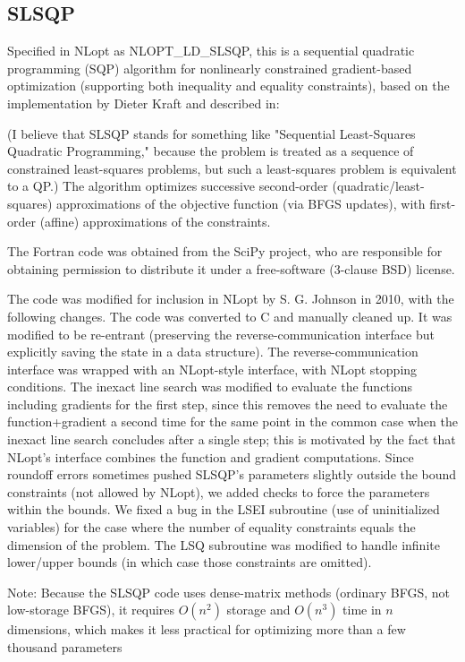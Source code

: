 \subsection{SLSQP}
Specified in NLopt as NLOPT\_LD\_SLSQP, this is a sequential quadratic programming (SQP) algorithm for nonlinearly constrained gradient-based optimization (supporting both inequality and equality constraints), based on the implementation by Dieter Kraft and described in: 

\cite{Kraft_1988, Kraft_1994}

(I believe that SLSQP stands for something like "Sequential Least-Squares Quadratic Programming," because the problem is treated as a sequence of constrained least-squares problems, but such a least-squares problem is equivalent to a QP.) The algorithm optimizes successive second-order (quadratic/least-squares) approximations of the objective function (via BFGS updates), with first-order (affine) approximations of the constraints. 

The Fortran code was obtained from the SciPy project, who are responsible for obtaining permission to distribute it under a free-software (3-clause BSD) license. 

The code was modified for inclusion in NLopt by S. G. Johnson in 2010, with the following changes. The code was converted to C and manually cleaned up. It was modified to be re-entrant (preserving the reverse-communication interface but explicitly saving the state in a data structure). The reverse-communication interface was wrapped with an NLopt-style interface, with NLopt stopping conditions. The inexact line search was modified to evaluate the functions including gradients for the first step, since this removes the need to evaluate the function+gradient a second time for the same point in the common case when the inexact line search concludes after a single step; this is motivated by the fact that NLopt's interface combines the function and gradient computations. Since roundoff errors sometimes pushed SLSQP's parameters slightly outside the bound constraints (not allowed by NLopt), we added checks to force the parameters within the bounds. We fixed a bug in the LSEI subroutine (use of uninitialized variables) for the case where the number of equality constraints equals the dimension of the problem. The LSQ subroutine was modified to handle infinite lower/upper bounds (in which case those constraints are omitted). 

Note: Because the SLSQP code uses dense-matrix methods (ordinary BFGS, not low-storage BFGS), it requires $O(n^2)$ storage and $O(n^3)$ time in $n$ dimensions, which makes it less practical for optimizing more than a few thousand parameters



